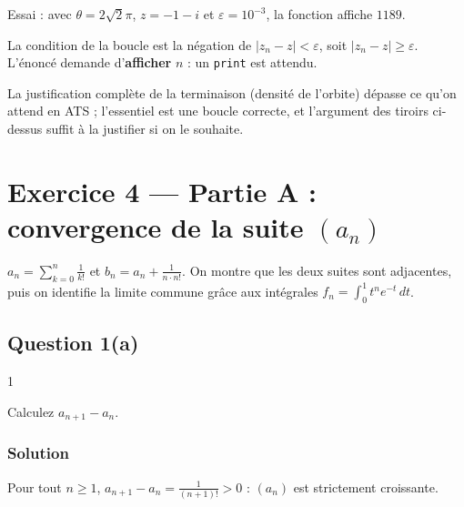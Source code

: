 \documentclass[11pt,a4paper]{article}
\begin{document}
Essai : avec \(\theta=2\sqrt2\pi\), \(z=-1-i\) et \(\varepsilon=10^{-3}\), la fonction affiche \(1189\).

\begin{piege}

La condition de la boucle est la négation de \(|z_n-z|<\varepsilon\), soit \(|z_n-z|\ge\varepsilon\). L'énoncé demande d'\textbf{afficher} \(n\) : un \texttt{print} est attendu.

\end{piege}

\begin{methode}

La justification complète de la terminaison (densité de l'orbite) dépasse ce qu'on attend en ATS ; l'essentiel est une boucle correcte, et l'argument des tiroirs ci-dessus suffit à la justifier si on le souhaite.

\end{methode}

\hypertarget{exercice-4-partie-a-convergence-de-la-suite-a_n}{%
\section{\texorpdfstring{Exercice 4 --- Partie A : convergence de la suite \((a_n)\)}{Exercice 4 --- Partie A : convergence de la suite (a\_n)}}\label{exercice-4-partie-a-convergence-de-la-suite-a_n}}

\(a_n=\sum_{k=0}^n\frac1{k!}\) et \(b_n=a_n+\frac1{n\cdot n!}\). On montre que les deux suites sont adjacentes, puis on identifie la limite commune grâce aux intégrales \(f_n=\int_0^1t^ne^{-t}\,dt\).

\hypertarget{question-1a-1}{%
\subsection{Question 1(a)}\label{question-1a-1}}

\begin{indication}{1}

Calculez \(a_{n+1}-a_n\).

\end{indication}

\hypertarget{solution-59}{%
\subsubsection{Solution}\label{solution-59}}

Pour tout \(n\ge1\), \(a_{n+1}-a_n=\frac1{(n+1)!}>0\) : \((a_n)\) est strictement croissante.
\end{document}
